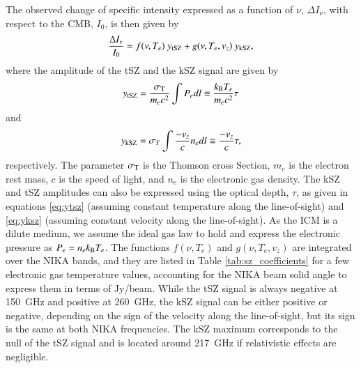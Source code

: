 \documentclass[twocolumn,traditabstract]{aa}
\begin{document}
The observed change of specific intensity expressed as a function of $\nu$, $\Delta I_{\nu}$, with respect to the CMB, $I_0$, is then given by 
\begin{equation}
	\frac{\Delta I_{\nu}}{I_0} =  f(\nu, T_e) \ y_{\rm tSZ} + g(\nu, T_e, v_z) \ y_{\rm kSZ},
\label{eq:dIsz}
\end{equation}
where the amplitude of the tSZ and the kSZ signal are given by
\begin{equation}
	y_{\rm tSZ} =  \frac{\sigma_{\rm T}}{m_e c^2} \int P_e dl \equiv \frac{k_{\rm B} T_e}{m_e c^2} \tau
\label{eq:ytsz}
\end{equation}
and
\begin{equation}
	y_{\rm kSZ} = \sigma_T \int \frac{-v_z}{c} n_e dl \equiv \frac{-v_z}{c} \tau,
\label{eq:yksz}
\end{equation}
respectively. The parameter $\sigma_{\rm T}$ is the Thomson cross Section, $m_e$ is the electron rest mass, $c$ is the speed of light, and $n_e$ is the electronic gas density. The kSZ and tSZ amplitudes can also be expressed using the optical depth, $\tau$, as given in equations \ref{eq:ytsz} (assuming constant temperature along the line-of-sight) and \ref{eq:yksz} (assuming constant velocity along the line-of-sight). As the ICM is a dilute medium, we assume the ideal gas law to hold and express the electronic pressure as $P_e = n_e k_{\rm B} T_e$. The functions $f(\nu, T_e)$ and $g(\nu, T_e, v_z)$ are integrated over the NIKA bands, and they are listed in Table \ref{tab:sz_coefficients} for a few electronic gas temperature values, accounting for the NIKA beam solid angle to express them in terms of Jy/beam. While the tSZ signal is always negative at 150~GHz and positive at 260~GHz, the kSZ signal can be either positive or negative, depending on the sign of the velocity along the line-of-sight, but its sign is the same at both NIKA frequencies. The kSZ maximum corresponds to the null of the tSZ signal and is located around 217~GHz if relativistic effects are negligible.


\end{document}
